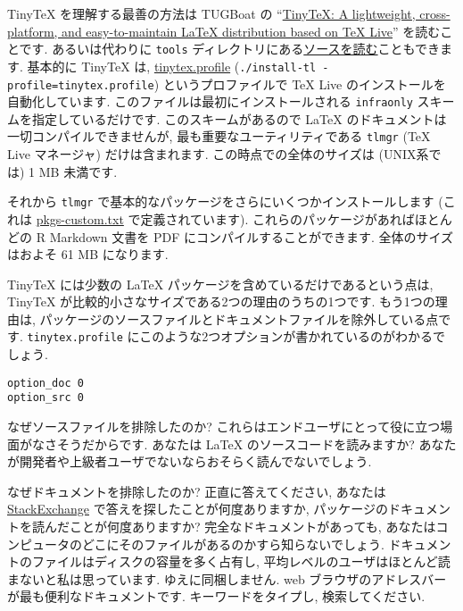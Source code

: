 \documentclass[
  xelatex,ja=standard,jafont=noto]{bxjsreport}
\begin{document}
TinyTeX を理解する最善の方法は TUGBoat の
``\href{https://tug.org/TUGboat/Contents/contents40-1.html}{TinyTeX: A
lightweight, cross-platform, and easy-to-maintain LaTeX distribution
based on TeX Live}'' を読むことです. あるいは代わりに \texttt{tools}
ディレクトリにある\href{https://github.com/yihui/tinytex/}{ソースを読む}こともできます.
基本的に TinyTeX は,
\href{https://github.com/yihui/tinytex/blob/master/tools/tinytex.profile}{tinytex.profile}
(\texttt{./install-tl\ -profile=tinytex.profile}) というプロファイルで
TeX Live のインストールを自動化しています.
このファイルは最初にインストールされる \texttt{infraonly}
スキームを指定しているだけです. このスキームがあるので LaTeX
のドキュメントは一切コンパイルできませんが,
最も重要なユーティリティである \texttt{tlmgr} (TeX Live マネージャ)
だけは含まれます. この時点での全体のサイズは (UNIX系では) 1 MB 未満です.

それから \texttt{tlmgr}
で基本的なパッケージをさらにいくつかインストールします (これは
\href{https://github.com/yihui/tinytex/blob/master/tools/pkgs-custom.txt}{pkgs-custom.txt}
で定義されています). これらのパッケージがあればほとんどの R Markdown
文書を PDF にコンパイルすることができます. 全体のサイズはおよそ 61 MB
になります.

TinyTeX には少数の LaTeX パッケージを含めているだけであるという点は,
TinyTeX が比較的小さなサイズである2つの理由のうちの1つです.
もう1つの理由は,
パッケージのソースファイルとドキュメントファイルを除外している点です.
\texttt{tinytex.profile}
にこのような2つオプションが書かれているのがわかるでしょう.

\begin{verbatim}
option_doc 0
option_src 0
\end{verbatim}

なぜソースファイルを排除したのか?
これらはエンドユーザにとって役に立つ場面がなさそうだからです. あなたは
LaTeX のソースコードを読みますか?
あなたが開発者や上級者ユーザでないならおそらく読んでないでしょう.

なぜドキュメントを排除したのか? 正直に答えてください, あなたは
\href{https://tex.stackexchange.com}{StackExchange}
で答えを探したことが何度ありますか,
パッケージのドキュメントを読んだことが何度ありますか?
完全なドキュメントがあっても,
あなたはコンピュータのどこにそのファイルがあるのかすら知らないでしょう.
ドキュメントのファイルはディスクの容量を多く占有し,
平均レベルのユーザはほとんど読まないと私は思っています.
ゆえに同梱しません. web
ブラウザのアドレスバーが最も便利なドキュメントです.
キーワードをタイプし, 検索してください.
\end{document}
